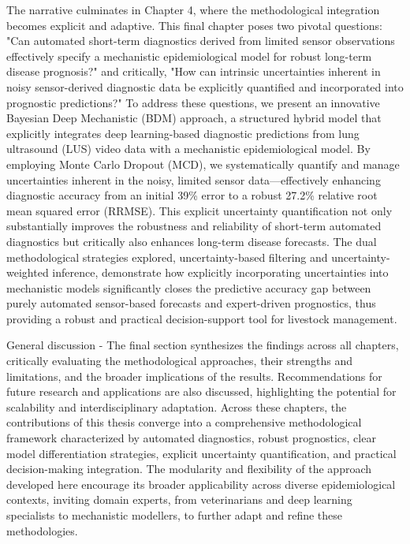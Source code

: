 The narrative culminates in Chapter 4, where the methodological integration becomes explicit and adaptive. This final chapter poses two pivotal questions: "Can automated short-term diagnostics derived from limited sensor observations effectively specify a mechanistic epidemiological model for robust long-term disease prognosis?" and critically, "How can intrinsic uncertainties inherent in noisy sensor-derived diagnostic data be explicitly quantified and incorporated into prognostic predictions?" To address these questions, we present an innovative Bayesian Deep Mechanistic (BDM) approach, a structured hybrid model that explicitly integrates deep learning-based diagnostic predictions from lung ultrasound (LUS) video data with a mechanistic epidemiological model. By employing Monte Carlo Dropout (MCD), we systematically quantify and manage uncertainties inherent in the noisy, limited sensor data—effectively enhancing diagnostic accuracy from an initial 39\% error to a robust 27.2\% relative root mean squared error (RRMSE). This explicit uncertainty quantification not only substantially improves the robustness and reliability of short-term automated diagnostics but critically also enhances long-term disease forecasts. The dual methodological strategies explored, uncertainty-based filtering and uncertainty-weighted inference, demonstrate how explicitly incorporating uncertainties into mechanistic models significantly closes the predictive accuracy gap between purely automated sensor-based forecasts and expert-driven prognostics, thus providing a robust and practical decision-support tool for livestock management.

General discussion - The final section synthesizes the findings across all chapters, critically evaluating the methodological approaches, their strengths and limitations, and the broader implications of the results. Recommendations for future research and applications are also discussed, highlighting the potential for scalability and interdisciplinary adaptation. Across these chapters, the contributions of this thesis converge into a comprehensive methodological framework characterized by automated diagnostics, robust prognostics, clear model differentiation strategies, explicit uncertainty quantification, and practical decision-making integration. The modularity and flexibility of the approach developed here encourage its broader applicability across diverse epidemiological contexts, inviting domain experts, from veterinarians and deep learning specialists to mechanistic modellers, to further adapt and refine these methodologies. 


